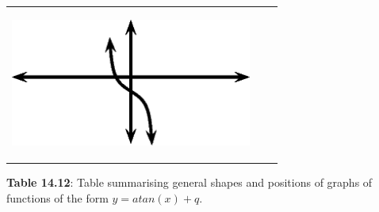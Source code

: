 \begin{center}
\begin{xtabular*}{\mytablewidth}[t]{|p{10\mystarwidth}|p{10\mystarwidth}|p{10\mystarwidth}|}
                  
    \setcounter{subfigure}{0}

\label{m39414*id91042}
    \begin{center}
    \label{m39414*id91042!!!underscore!!!media}\label{m39414*id91042!!!underscore!!!printimage}\includegraphics[width=300px]{col11306.imgs/m39414_MG10C15_037.png} %
        
      \vspace{2pt}
    \vspace{.1in}
    
    \end{center}



    \addtocounter{footnote}{-0}
    
     \tabularnewline{}
    \end{xtabular*}
      \end{center}
    \begin{center}{\small\bfseries Table 14.12}: Table summarising general shapes and positions of graphs of functions of the form \begin{math}y=atan\left(x\right)+q\end{math}.\end{center}
    
    \addtocounter{footnote}{-0}
    
    \par
  
        \label{m39414*uid87}
            \nopagebreak
            
